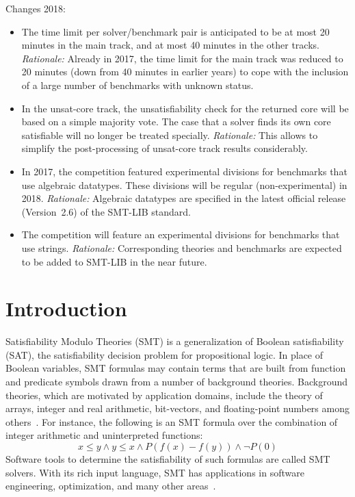 \documentclass[twoside,11pt]{article}
\begin{document}
\begin{tjark}
Changes 2018:
\begin{itemize}
\item The time limit per solver/benchmark pair is anticipated to be at
  most 20 minutes in the main track, and at most 40 minutes in the
  other tracks.  \emph{Rationale:} Already in 2017, the time limit for
  the main track was reduced to 20 minutes (down from 40 minutes in
  earlier years) to cope with the inclusion of a large number of
  benchmarks with unknown status.
\item In the unsat-core track, the unsatisfiability check for the
  returned core will be based on a simple majority vote.  The case
  that a solver finds its own core satisfiable will no longer be
  treated specially.  \emph{Rationale:} This allows to simplify the
  post-processing of unsat-core track results considerably.
\item In 2017, the competition featured experimental divisions for
  benchmarks that use algebraic datatypes.  These divisions will be
  regular (non-experimental) in 2018. \emph{Rationale:} Algebraic
  datatypes are specified in the latest official release (Version~2.6)
  of the SMT-LIB standard.
\item The competition will feature an experimental divisions for
  benchmarks that use strings.  \emph{Rationale:} Corresponding
  theories and benchmarks are expected to be added to SMT-LIB in the
  near future.
\end{itemize}
\end{tjark}


\section{Introduction}
\label{sec:introduction}

Satisfiability Modulo Theories (SMT) is a generalization of Boolean
satisfiability (SAT), the satisfiability decision problem for
propositional logic.  In place of Boolean variables, SMT formulas may
contain terms that are built from function and predicate symbols drawn
from a number of background theories.  Background theories, which are
motivated by application domains, include the theory of arrays,
integer and real arithmetic, bit-vectors, and floating-point numbers
among others~\cite{BarFT-RR-17}.  For instance, the following is an
SMT formula over the combination of integer arithmetic and
uninterpreted functions:
%
$$x \leq y \wedge y \leq x \wedge P (f(x) - f(y)) \wedge \neg P(0)$$
%
Software tools to determine the satisfiability of such formulas are
called SMT solvers.  With its rich input language, SMT has
applications in software engineering, optimization, and many other
areas~\cite{DeMoura:2011:SMT}.
\end{document}
